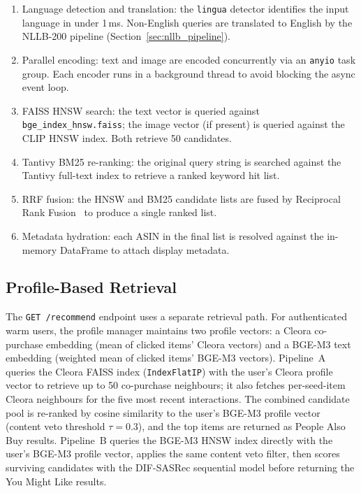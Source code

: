 \begin{enumerate}
    \item Language detection and translation: the \texttt{lingua} detector identifies the input language in under 1\,ms. Non-English queries are translated to English by the NLLB-200 pipeline (Section~\ref{sec:nllb_pipeline}).
    \item Parallel encoding: text and image are encoded concurrently via an \texttt{anyio} task group. Each encoder runs in a background thread to avoid blocking the async event loop.
    \item FAISS HNSW search: the text vector is queried against \nolinkurl{bge_index_hnsw.faiss}; the image vector (if present) is queried against the CLIP HNSW index. Both retrieve 50 candidates.
    \item Tantivy BM25 re-ranking: the original query string is searched against the Tantivy full-text index to retrieve a ranked keyword hit list.
    \item RRF fusion: the HNSW and BM25 candidate lists are fused by Reciprocal Rank Fusion~\cite{cormack2009rrf} to produce a single ranked list.
    \item Metadata hydration: each ASIN in the final list is resolved against the in-memory DataFrame to attach display metadata.
\end{enumerate}

\subsection{Profile-Based Retrieval}

The \texttt{GET /recommend} endpoint uses a separate retrieval path.
For authenticated warm users, the profile manager maintains two profile vectors: a Cleora co-purchase embedding (mean of clicked items' Cleora vectors) and a BGE-M3 text embedding (weighted mean of clicked items' BGE-M3 vectors).
Pipeline~A queries the Cleora FAISS index (\texttt{IndexFlatIP}) with the user's Cleora profile vector to retrieve up to 50 co-purchase neighbours; it also fetches per-seed-item Cleora neighbours for the five most recent interactions.
The combined candidate pool is re-ranked by cosine similarity to the user's BGE-M3 profile vector (content veto threshold $\tau = 0.3$), and the top items are returned as People Also Buy results.
Pipeline~B queries the BGE-M3 HNSW index directly with the user's BGE-M3 profile vector, applies the same content veto filter, then scores surviving candidates with the DIF-SASRec sequential model before returning the You Might Like results.
